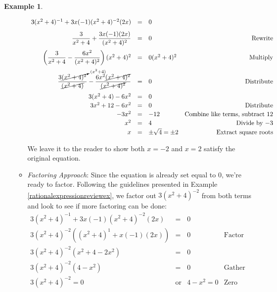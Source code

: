 \documentclass[11pt]{article}
\theoremstyle{definition}  %
\newtheorem{ex}{\bf Example}
\begin{document}
\begin{ex}
\begin{enumerate}
\begin{itemize}
\[\begin{array}{rclr}
3(x^2+4)^{-1} + 3x(-1)(x^2+4)^{-2}(2x)& = &  0 & \\ [8pt]

\dfrac{3}{x^2+4} + \dfrac{3x(-1)(2x)}{(x^2+4)^2} & = & 0 & \text{Rewrite} \\ [12pt]
\left(\dfrac{3}{x^2+4} - \dfrac{6x^2}{(x^2+4)^2} \right)(x^2+4)^2 & = & 0 (x^2+4)^2 & \text{Multiply} \\[12pt]

\dfrac{3\cancelto{(x^2+4)}{(x^2 + 4)^2}}{\cancel{(x^2+4)}}  - \dfrac{6x^2\cancel{(x^2+4)^2}}{\cancel{(x^2+4)^2}} & = & 0 & \text{Distribute} \\ [12pt]

3(x^2+4) - 6x^2 & = & 0 & \\ [2pt]

3x^2 + 12 - 6x^2 & = & 0 & \text{Distribute} \\ [2pt]

-3x^2 & = & -12 & \text{Combine like terms, subtract $12$} \\ [2pt]

x^2 & = & 4 & \text{Divide by $-3$} \\ [2pt]

x & = & \pm \sqrt{4} = \pm 2 & \text{Extract square roots} \\ 

\end{array} \]

We leave it to the reader to show both $x = -2$ and $x = 2$ satisfy the original equation.

\item  \textit{Factoring Approach}:  Since the equation is already set equal to $0$, we're ready to factor. Following the guidelines presented in Example \ref{rationalexpressionreviewex}, we factor out $3(x^2+4)^{-2}$ from both terms and look to see if more factoring can be done:\[ \begin{array}{rclr}

3(x^2+4)^{-1} + 3x(-1)(x^2+4)^{-2}(2x)& = &  0 & \\ [2pt]

3(x^2+4)^{-2}( (x^2+4)^{1} + x(-1)(2x)) & = & 0 & \text{Factor} \\ [2pt]

3(x^2+4)^{-2}( x^2 + 4 - 2x^2 ) & = & 0 & \\ [2pt]

3(x^2+4)^{-2}(4 - x^2) & = & 0 & \text{Gather like terms} \\ [2pt]

3(x^2+4)^{-2} = 0 & \text{or} & 4 - x^2 = 0 & \text{Zero Product Property} \\ [2pt]


\end{array}\]
\end{itemize}
\end{enumerate}
\end{ex}
\end{document}
